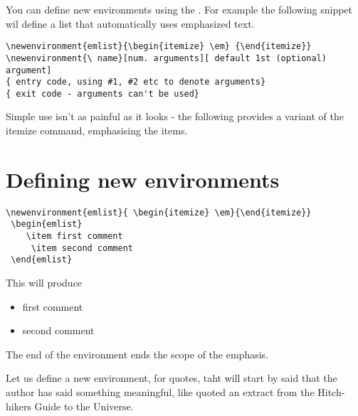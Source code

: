 You can define new environments using the . For example the following snippet wil define a list that automatically uses emphasized text.

\begin{Verbatim}
\newenvironment{emlist}{\begin{itemize} \em} {\end{itemize}}
\newenvironment{\ name}[num. arguments][ default 1st (optional) argument]
{ entry code, using #1, #2 etc to denote arguments} 
{ exit code - arguments can't be used}
\end{Verbatim}



Simple use isn't as painful as it looks - the following provides a variant of the itemize command, emphasising the items.

\section{Defining new environments}
\begin{verbatim}
\newenvironment{emlist}{ \begin{itemize} \em}{\end{itemize}}
 \begin{emlist}
    \item first comment
     \item second comment
 \end{emlist}
\end{verbatim}
   
This will produce

\newenvironment{emlist}{ \begin{itemize} \em}{\end{itemize}}
 \begin{emlist}
    \item first comment
     \item second comment
 \end{emlist}




The end of the environment ends the scope of the emphasis.

Let us define a new environment, for quotes, taht will start by said that the author has said something meaningful, like quoted an extract from the Hitch-hikers Guide to the Universe.

\newenvironment{quotationX}[2][George]%
               {\par \ldots #1 \list{}{%
                           \em     %
                            \listparindent  \parindent
                           \itemindent    \listparindent%
                           \rightmargin   \leftmargin%
                           \setlength{\parsep}{2pt}
                          \setlength{\topsep}{10pt}
                         \ldots #2}%
                \item[] 
              }%
               {\endlist } %

